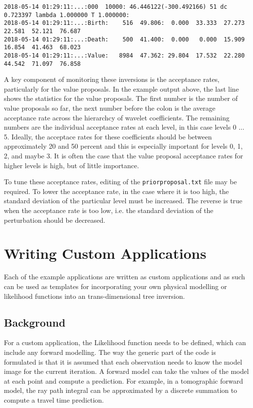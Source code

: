 \documentclass[a4paper,12pt]{article}
\begin{document}
{
  \tiny
\begin{verbatim}
2018-05-14 01:29:11:...:000  10000: 46.446122(-300.492166) 51 dc 0.723397 lambda 1.000000 T 1.000000:
2018-05-14 01:29:11:...:Birth:    516  49.806:  0.000  33.333  27.273  22.581  52.121  76.687 
2018-05-14 01:29:11:...:Death:    500  41.400:  0.000   0.000  15.909  16.854  41.463  68.023 
2018-05-14 01:29:11:...:Value:   8984  47.362: 29.804  17.532  22.280  44.542  71.097  76.858 
\end{verbatim}
}

A key component of monitoring these inversions is the acceptance
rates, particularly for the value proposals. In the example output
above, the last line shows the statistics for the value proposals. The
first number is the number of value proposals so far, the next number
before the colon is the average acceptance rate across the hierarchcy
of wavelet coefficients. The remaining numbers are the individual
acceptance rates at each level, in this case levels 0 $\ldots$
5. Ideally, the acceptace rates for these coefficients should be
between approximately 20 and 50 percent and this is especially
important for levels 0, 1, 2, and maybe 3. It is often the case that
the value proposal acceptance rates for higher levels is high, but of
little importance.

To tune these acceptance rates, editing of the {\tt priorproposal.txt}
file may be required. To lower the acceptance rate, in the case where it is too
high, the standard deviation of the particular level must be increased. The
reverse is true when the acceptance rate is too low, i.e. the standard deviation
of the perturbation should be decreased.

\section{Writing Custom Applications}

Each of the example applications are written as custom applications and as such
can be used as templates for incorporating your own physical modelling or
likelihood functions into an trans-dimensional tree inversion.

\subsection{Background}

For a custom application, the Likelihood function needs to be defined,
which can include any forward modelling.  The way the generic part of
the code is formulated is that it is assumed that each observation
needs to know the model image for the current iteration. A forward
model can take the values of the model at each point and compute a
prediction. For example, in a tomographic forward model, the ray path
integral can be approximated by a discrete summation to compute a
travel time prediction.
\end{document}
